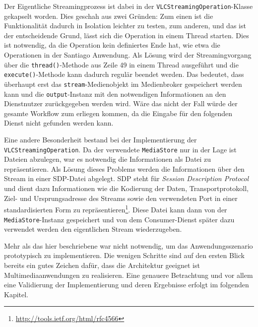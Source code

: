   Der Eigentliche Streamingprozess ist dabei in der \verb!VLCStreamingOperation!-Klasse gekapselt worden. Dies geschah aus zwei Gründen: Zum einen ist die Funktionalität dadurch in Isolation leichter zu testen, zum anderen, und das ist der entscheidende Grund, lässt sich die Operation in einem Thread starten. Dies ist notwendig, da die Operation kein definiertes Ende hat, wie etwa die Operationen in der Santiago Anwendung. Als Lösung wird der Streamingvorgang über die \verb!thread()!-Methode aus Zeile 49 in einem Thread ausgeführt und die \verb!execute()!-Methode kann dadurch regulär beendet werden. Das bedeutet, dass überhaupt erst das \verb!stream!-Medienobjekt im Medienbroker gespeichert werden kann und die \verb!output!-Instanz mit den notwendigen Informationen an den Dienstnutzer zurückgegeben werden wird. Wäre das nicht der Fall würde der gesamte Workflow zum erliegen kommen, da die Eingabe für den folgenden Dienst nicht gefunden werden kann.
  
  Eine andere Besonderheit bestand bei der Implementierung der \verb!VLCStreamingOperation!. Da der verwendete \verb!MediaStore! nur in der Lage ist Dateien abzulegen, war es notwendig die Informationen als Datei zu repräsentieren. Als Lösung dieses Problems werden die Informationen über den Stream in einer SDP-Datei abgelegt. SDP steht für \emph{Session Description Protocol} und dient dazu Informationen wie die Kodierung der Daten, Transportprotokoll, Ziel- und Ursprungsadresse des Streams sowie den verwendeten Port in einer standardisierten Form zu repräsentieren\footnote{\url{http://tools.ietf.org/html/rfc4566}}. Diese Datei kann dann von der \verb!MediaStore!-Instanz gespeichert und von dem Consumer-Dienst später dazu verwendet werden den eigentlichen Stream wiederzugeben.

  Mehr als das hier beschriebene war nicht notwendig, um das Anwendungsszenario prototypisch zu implementieren. Die wenigen Schritte sind auf den ersten Blick bereits ein gutes Zeichen dafür, dass die Architektur geeignet ist Multimediaanwendungen zu realisieren. Eine genauere Betrachtung und vor allem eine Validierung der Implementierung und deren Ergebnisse erfolgt im folgenden Kapitel.


